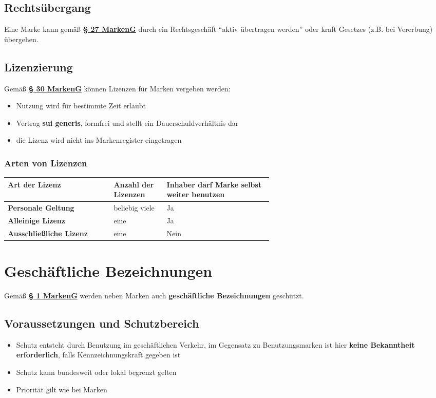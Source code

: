 \documentclass[12pt,A4]{extarticle}
\newcommand{\highlight}[1]{\textcolor{highlightColor}{\textbf{#1}}}
\newcommand{\markenG}[2][]{\textbf{\textcolor{markenGesetzLink}{\href{https://www.gesetze-im-internet.de/markeng/__#2.html}{§ #2 \ifthenelse{\equal{#1}{}}{}{#1 }MarkenG}}}}
\begin{document}
\subsection{Rechtsübergang}
Eine Marke kann gemäß \markenG{27} durch ein Rechtsgeschäft ``aktiv übertragen werden'' oder kraft Gesetzes (z.B. bei Vererbung) übergehen.

\subsection{Lizenzierung}
Gemäß \markenG{30} können Lizenzen für Marken vergeben werden:
\begin{itemize}
  \item{Nutzung wird für bestimmte Zeit erlaubt}
  \item{Vertrag \textbf{sui generis}, formfrei und stellt ein Dauerschuldverhältnis dar}
  \item{die Lizenz wird nicht ins Markenregister eingetragen}
\end{itemize}

\subsubsection{Arten von Lizenzen}
\bgroup
\def\arraystretch{1.5}
\begin{table}[h]
  \begin{tabular}{|l|p{0.2\linewidth}|p{0.4\linewidth}|}
    \hline \rowcolor{gray!30}
    Art der Lizenz                  & Anzahl der Lizenzen & Inhaber darf Marke selbst weiter benutzen \\ \hline
    \textbf{Personale Geltung}      & beliebig viele      & Ja                                        \\ \hline
    \textbf{Alleinige Lizenz}       & eine                & Ja                                        \\ \hline
    \textbf{Ausschließliche Lizenz} & eine                & Nein                                      \\ \hline
  \end{tabular}
\end{table}

\newpage
\section{Geschäftliche Bezeichnungen}
Gemäß \markenG{1} werden neben Marken auch \highlight{geschäftliche Bezeichnungen} geschützt.

\subsection{Voraussetzungen und Schutzbereich}
\begin{itemize}
  \item{Schutz entsteht durch Benutzung im geschäftlichen Verkehr, im Gegensatz zu Benutzungsmarken ist hier \textbf{keine Bekanntheit erforderlich}, falls Kennzeichnungskraft gegeben ist}
  \item{Schutz kann bundesweit oder lokal begrenzt gelten}
  \item{Priorität gilt wie bei Marken}
\end{itemize}
\end{document}
